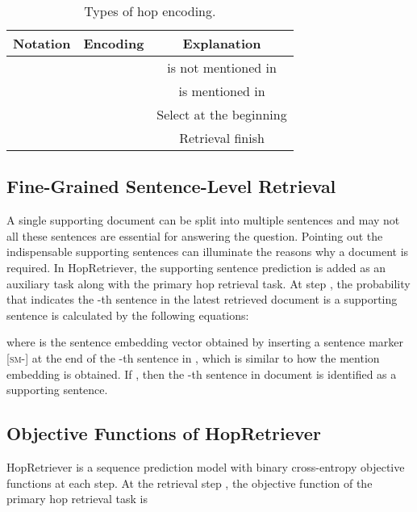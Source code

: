 \documentclass[letterpaper]{article} \usepackage{aaai21}  \usepackage{times}  \usepackage{helvet} \usepackage{courier}  \usepackage[hyphens]{url}  \usepackage{graphicx} \urlstyle{rm} \def\UrlFont{\rm}  \usepackage{graphicx}  \usepackage{natbib}  \usepackage{caption} \frenchspacing  \setlength{\pdfpagewidth}{8.5in}  \setlength{\pdfpageheight}{11in}
\begin{document}
\begin{table}[ht]
    \footnotesize
    \centering
    \begin{center}
    \begin{tabular}{c|c|c}
    \hline 
    \textbf{Notation}                & \textbf{Encoding}                         & \textbf{Explanation}              \\ \hline
    \multirow{2}{*}{}   &  &  is not mentioned in  \\
                                     &         &  is mentioned in        \\\hline
                        &  & Select  at the beginning     \\
                          &  & Retrieval finish                  \\ \hline
    \end{tabular}
    \end{center}
    \caption{Types of hop encoding.}
    \label{tab:hop_type}
\end{table}


\subsection{Fine-Grained Sentence-Level Retrieval}
A single supporting document can be split into multiple sentences and may not all these sentences are essential for answering the question. Pointing out the indispensable supporting sentences can illuminate the reasons why a document is required. In HopRetriever, the supporting sentence prediction is added as an auxiliary task along with the primary hop retrieval task. At step , the probability  that indicates the -th sentence in the latest retrieved document  is a supporting sentence is calculated by the following equations:


where  is the sentence embedding vector obtained by inserting a sentence marker \textsc{[sm-]} at the end of the -th sentence in , which is similar to how the mention embedding is obtained. If , then the -th sentence in document  is identified as a supporting sentence.


\subsection{Objective Functions of HopRetriever}
HopRetriever is a sequence prediction model with binary cross-entropy objective functions at each step. At the retrieval step , the objective function of the primary hop retrieval task is
\end{document}
